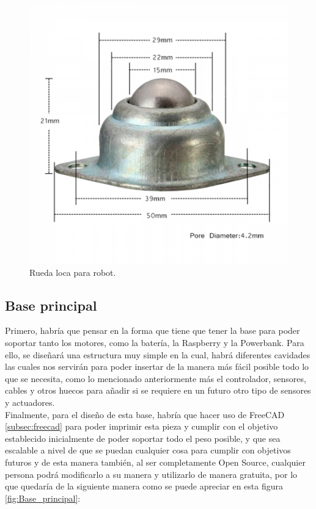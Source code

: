 \begin{figure}[H]
  \centering
  \includegraphics[scale=0.4]{figs/rueda_loca} %
  \caption{Rueda loca para robot.}
  \label{fig:Rueda_loca}
\end{figure}



\subsection{Base principal}
\label{subsec:base_principal}

Primero, habría que pensar en la forma que tiene que tener la base para poder soportar tanto los motores, como la batería, la Raspberry y la Powerbank. Para ello, se diseñará una estructura muy simple en la cual, habrá diferentes cavidades las cuales nos servirán para poder insertar de la manera más fácil posible todo lo que se necesita, como lo mencionado anteriormente más el controlador, sensores, cables y otros huecos para añadir si se requiere en un futuro otro tipo de sensores y actuadores. \\

Finalmente, para el diseño de esta base, habría que hacer uso de FreeCAD \ref{subsec:freecad} para poder imprimir esta pieza y cumplir con el objetivo establecido inicialmente de poder soportar todo el peso posible, y que sea escalable a nivel de que se puedan cualquier cosa para cumplir con objetivos futuros y de esta manera también, al ser completamente Open Source, cualquier persona podrá modificarlo a su manera y utilizarlo de manera gratuita, por lo que quedaría de la siguiente manera como se puede apreciar en esta figura \ref{fig:Base_principal}:

